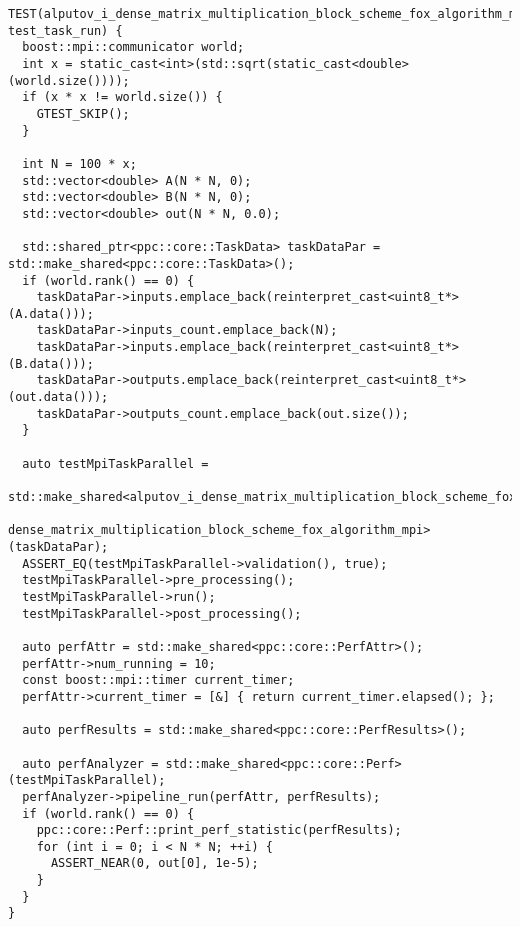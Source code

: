 \documentclass{report}
\begin{document}
\begin{lstlisting}[caption={main.cpp(perf tests)},label=lst:opsmpi2]
TEST(alputov_i_dense_matrix_multiplication_block_scheme_fox_algorithm_mpi, test_task_run) {
  boost::mpi::communicator world;
  int x = static_cast<int>(std::sqrt(static_cast<double>(world.size())));
  if (x * x != world.size()) {
    GTEST_SKIP();
  }

  int N = 100 * x;
  std::vector<double> A(N * N, 0);
  std::vector<double> B(N * N, 0);
  std::vector<double> out(N * N, 0.0);

  std::shared_ptr<ppc::core::TaskData> taskDataPar = std::make_shared<ppc::core::TaskData>();
  if (world.rank() == 0) {
    taskDataPar->inputs.emplace_back(reinterpret_cast<uint8_t*>(A.data()));
    taskDataPar->inputs_count.emplace_back(N);
    taskDataPar->inputs.emplace_back(reinterpret_cast<uint8_t*>(B.data()));
    taskDataPar->outputs.emplace_back(reinterpret_cast<uint8_t*>(out.data()));
    taskDataPar->outputs_count.emplace_back(out.size());
  }

  auto testMpiTaskParallel =
      std::make_shared<alputov_i_dense_matrix_multiplication_block_scheme_fox_algorithm::
                           dense_matrix_multiplication_block_scheme_fox_algorithm_mpi>(taskDataPar);
  ASSERT_EQ(testMpiTaskParallel->validation(), true);
  testMpiTaskParallel->pre_processing();
  testMpiTaskParallel->run();
  testMpiTaskParallel->post_processing();

  auto perfAttr = std::make_shared<ppc::core::PerfAttr>();
  perfAttr->num_running = 10;
  const boost::mpi::timer current_timer;
  perfAttr->current_timer = [&] { return current_timer.elapsed(); };

  auto perfResults = std::make_shared<ppc::core::PerfResults>();

  auto perfAnalyzer = std::make_shared<ppc::core::Perf>(testMpiTaskParallel);
  perfAnalyzer->pipeline_run(perfAttr, perfResults);
  if (world.rank() == 0) {
    ppc::core::Perf::print_perf_statistic(perfResults);
    for (int i = 0; i < N * N; ++i) {
      ASSERT_NEAR(0, out[0], 1e-5);
    }
  }
}

\end{lstlisting}
\end{document}
